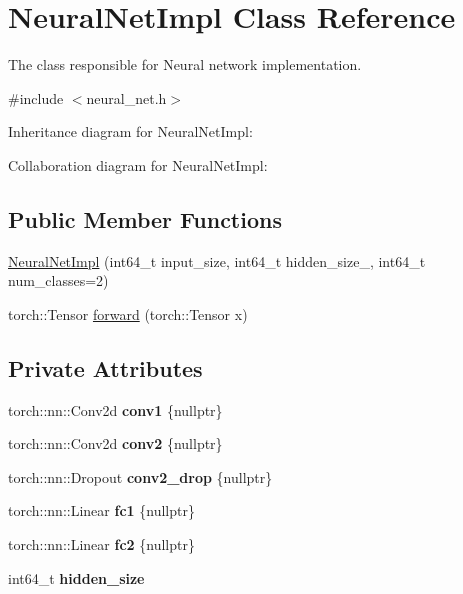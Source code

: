 \hypertarget{classNeuralNetImpl}{}\section{Neural\+Net\+Impl Class Reference}
\label{classNeuralNetImpl}


The class responsible for Neural network implementation.  




{\ttfamily \#include $<$neural\+\_\+net.\+h$>$}



Inheritance diagram for Neural\+Net\+Impl\+:


Collaboration diagram for Neural\+Net\+Impl\+:
\subsection*{Public Member Functions}
\begin{DoxyCompactItemize}
\item 
\hyperlink{classNeuralNetImpl_adc642ff317e5b828880aea3df16a4b23}{Neural\+Net\+Impl} (int64\+\_\+t input\+\_\+size, int64\+\_\+t hidden\+\_\+size\+\_\+, int64\+\_\+t num\+\_\+classes=2)
\item 
torch\+::\+Tensor \hyperlink{classNeuralNetImpl_ae392a0bba51173dd708f8522ece17dae}{forward} (torch\+::\+Tensor x)
\end{DoxyCompactItemize}
\subsection*{Private Attributes}
\begin{DoxyCompactItemize}
\item 
\mbox{\label{classNeuralNetImpl_a4ad265cf6b7c23b1ac2bf35ed34709de}} 
torch\+::nn\+::\+Conv2d {\bfseries conv1} \{nullptr\}
\item 
\mbox{\label{classNeuralNetImpl_a7f2fdaa5cd22b7ee94a3a57ef70e0dc8}} 
torch\+::nn\+::\+Conv2d {\bfseries conv2} \{nullptr\}
\item 
\mbox{\label{classNeuralNetImpl_ab0d179f56558cfcb3d6aba6caa9c80f8}} 
torch\+::nn\+::\+Dropout {\bfseries conv2\+\_\+drop} \{nullptr\}
\item 
\mbox{\label{classNeuralNetImpl_a470a2d9ea6d8a8dc48885389126b347a}} 
torch\+::nn\+::\+Linear {\bfseries fc1} \{nullptr\}
\item 
\mbox{\label{classNeuralNetImpl_a07e4353d9e399ceaca1cc4de5c08912f}} 
torch\+::nn\+::\+Linear {\bfseries fc2} \{nullptr\}
\item 
\mbox{\label{classNeuralNetImpl_ad02e9e8ad7472c0ff5da7138c199f921}} 
int64\+\_\+t {\bfseries hidden\+\_\+size}
\end{DoxyCompactItemize}



